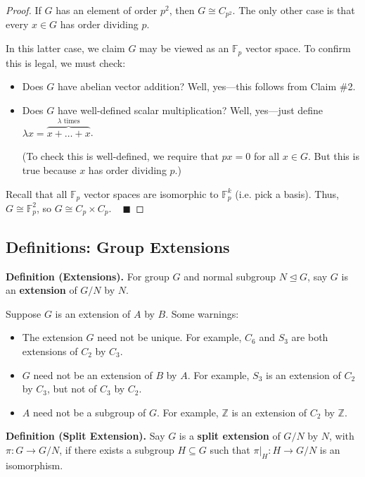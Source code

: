 \begin{proof}
If $G$ has an element of order $p^2$, then $G \cong C_{p^2}$.  The only other case is that every $x \in G$ has order dividing $p$.

In this latter case, we claim $G$ may be viewed as an $\mathbb{F}_p$ vector space.  To confirm this is legal, we must check:
\begin{itemize}
    \item Does $G$ have abelian vector addition?  Well, yes---this follows from Claim \#2. \vspace{-0.3cm}
    \item Does $G$ have well-defined scalar multiplication?  Well, yes---just define $\lambda x = \overbrace{x + \dots + x}^{\lambda \text{ times}}$. \vspace{-0.15cm}
    
    (To check this is well-defined, we require that $px = 0$ for all $x \in G$.  But this is true because $x$ has order dividing $p$.)
\end{itemize}
Recall that all $\mathbb{F}_p$ vector spaces are isomorphic to $\mathbb{F}_p^k$ (i.e. pick a basis).  Thus, $G \cong \mathbb{F}_p^2$, so $G \cong C_p \times C_p$. ~ $\blacksquare$
\end{proof}

\subsection{Definitions: Group Extensions}

\textbf{Definition (Extensions).} For group $G$ and normal subgroup $N \unlhd G$, say $G$ is an \textbf{extension} of $G/N$ by $N$.

Suppose $G$ is an extension of $A$ by $B$.  Some warnings:
\begin{itemize}
    \item The extension $G$ need not be unique.  For example, $C_6$ and $S_3$ are both extensions of $C_2$ by $C_3$.
    \item $G$ need not be an extension of $B$ by $A$.  For example, $S_3$ is an extension of $C_2$ by $C_3$, but not of $C_3$ by $C_2$.
    \item $A$ need not be a subgroup of $G$.  For example, $\mathbb{Z}$ is an extension of $C_2$ by $\mathbb{Z}$.
\end{itemize}

\textbf{Definition (Split Extension).} Say $G$ is a \textbf{split extension} of $G/N$ by $N$, with $\pi: G \to G/N$, if there exists a subgroup $H \subseteq G$ such that $\pi |_H: H \to G/N$ is an isomorphism.

